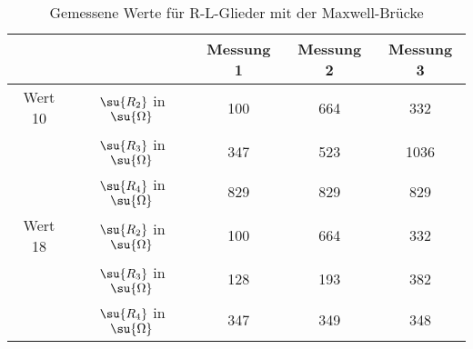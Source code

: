 \begin{table}
  \centering
  \label{tab:Maxwell}
  \caption{Gemessene Werte für R-L-Glieder mit der Maxwell-Brücke}
  \begin{tabular}{ c c c c c }
    \toprule
    & & Messung 1 & Messung 2 & Messung 3 \\
    \midrule
    Wert 10 & \multicolumn{1}{c|}{$\su{R_2}$  in  $\su{\Omega} $ } & 100 & 664 & 332 \\
            & \multicolumn{1}{c|}{$\su{R_3}$  in  $\su{\Omega} $ } & 347 & 523 & 1036 \\
            & \multicolumn{1}{c|}{$\su{R_4}$  in  $\su{\Omega} $ } & 829 & 829 & 829 \\
    \midrule
    Wert 18 & \multicolumn{1}{c|}{$\su{R_2}$  in  $\su{\Omega} $ } & 100 & 664 & 332 \\
            & \multicolumn{1}{c|}{$\su{R_3}$  in  $\su{\Omega} $ } & 128 & 193 & 382 \\
            & \multicolumn{1}{c|}{$\su{R_4}$  in  $\su{\Omega} $ } & 347 & 349 & 348 \\
    \bottomrule
  \end{tabular}
\end{table}

